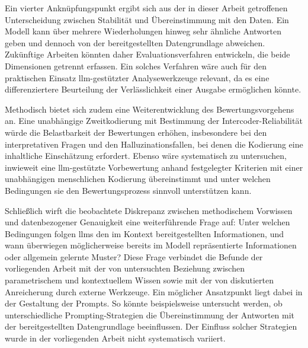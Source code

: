 Ein vierter Anknüpfungspunkt ergibt sich aus der in dieser Arbeit getroffenen Unterscheidung zwischen Stabilität und Übereinstimmung mit den Daten. Ein Modell kann über mehrere Wiederholungen hinweg sehr ähnliche Antworten geben und dennoch von der bereitgestellten Datengrundlage abweichen. Zukünftige Arbeiten könnten daher Evaluationsverfahren entwickeln, die beide Dimensionen getrennt erfassen. Ein solches Verfahren wäre auch für den praktischen Einsatz \gls{llm}-gestützter Analysewerkzeuge relevant, da es eine differenziertere Beurteilung der Verlässlichkeit einer Ausgabe ermöglichen könnte.

Methodisch bietet sich zudem eine Weiterentwicklung des Bewertungsvorgehens an. Eine unabhängige Zweitkodierung mit Bestimmung der Intercoder-Reliabilität würde die Belastbarkeit der Bewertungen erhöhen, insbesondere bei den interpretativen Fragen und den Halluzinationsfallen, bei denen die Kodierung eine inhaltliche Einschätzung erfordert. Ebenso wäre systematisch zu untersuchen, inwieweit eine \gls{llm}-gestützte Vorbewertung anhand festgelegter Kriterien mit einer unabhängigen menschlichen Kodierung übereinstimmt und unter welchen Bedingungen sie den Bewertungsprozess sinnvoll unterstützen kann.

Schließlich wirft die beobachtete Diskrepanz zwischen methodischem Vorwissen und datenbezogener Genauigkeit eine weiterführende Frage auf: Unter welchen Bedingungen folgen \glspl{llm} den im Kontext bereitgestellten Informationen, und wann überwiegen möglicherweise bereits im Modell repräsentierte Informationen oder allgemein gelernte Muster? Diese Frage verbindet die Befunde der vorliegenden Arbeit mit der von \textcite{cheng_understanding_2024} untersuchten Beziehung zwischen parametrischem und kontextuellem Wissen sowie mit der von \textcite{xu_hallucination_2025} diskutierten Anreicherung durch externe Werkzeuge. Ein möglicher Ansatzpunkt liegt dabei in der Gestaltung der Prompts. So könnte beispielsweise untersucht werden, ob unterschiedliche Prompting-Strategien die Übereinstimmung der Antworten mit der bereitgestellten Datengrundlage beeinflussen. Der Einfluss solcher Strategien wurde in der vorliegenden Arbeit nicht systematisch variiert.